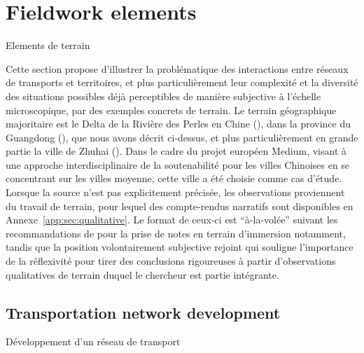 


\newpage


\section{Fieldwork elements}{Elements de terrain}

\label{sec:qualitative}




Cette section propose d'illustrer la problématique des interactions entre réseaux de transports et territoires, et plus particulièrement leur complexité et la diversité des situations possibles déjà perceptibles de manière subjective à l'échelle microscopique, par des exemples concrets de terrain. Le terrain géographique majoritaire est le Delta de la Rivière des Perles en Chine (), dans la province du Guangdong (), que nous avons décrit ci-dessus, et plus particulièrement en grande partie la ville de Zhuhai (). Dans le cadre du projet européen Medium, visant à une approche interdisciplinaire de la soutenabilité pour les villes Chinoises en se concentrant sur les villes moyenne, cette ville a été choisie comme cas d'étude. Lorsque la source n'est pas explicitement précisée, les observations proviennent du travail de terrain, pour lequel des compte-rendus narratifs sont disponibles en Annexe~\ref{app:sec:qualitative}. Le format de ceux-ci est ``à-la-volée'' suivant les recommandations de \cite{goffman1989fieldwork} pour la prise de notes en terrain d'immersion notamment, tandis que la position volontairement subjective rejoint \cite{ball1990self} qui souligne l'importance de la réflexivité pour tirer des conclusions rigoureuses à partir d'observations qualitatives de terrain duquel le chercheur est partie intégrante.







\subsection{Transportation network development}{Développement d'un réseau de transport}



